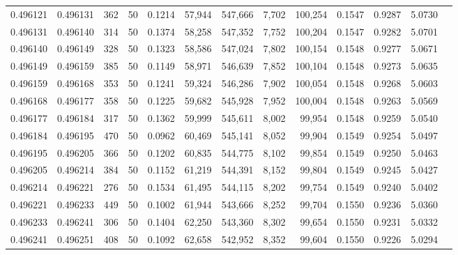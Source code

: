 \begin{tabular}{rrrrrrrrrrrrr}
0.496121 & 0.496131 & 362 &  50 &                                     0.1214 &  57,944 & 547,666 &   7,702 & 100,254 & 0.1547 & 0.9287 & 5.0730 \\
0.496131 & 0.496140 & 314 &  50 &                                     0.1374 &  58,258 & 547,352 &   7,752 & 100,204 & 0.1547 & 0.9282 & 5.0701 \\
0.496140 & 0.496149 & 328 &  50 &                                     0.1323 &  58,586 & 547,024 &   7,802 & 100,154 & 0.1548 & 0.9277 & 5.0671 \\
0.496149 & 0.496159 & 385 &  50 &                                     0.1149 &  58,971 & 546,639 &   7,852 & 100,104 & 0.1548 & 0.9273 & 5.0635 \\
0.496159 & 0.496168 & 353 &  50 &                                     0.1241 &  59,324 & 546,286 &   7,902 & 100,054 & 0.1548 & 0.9268 & 5.0603 \\
0.496168 & 0.496177 & 358 &  50 &                                     0.1225 &  59,682 & 545,928 &   7,952 & 100,004 & 0.1548 & 0.9263 & 5.0569 \\
0.496177 & 0.496184 & 317 &  50 &                                     0.1362 &  59,999 & 545,611 &   8,002 &  99,954 & 0.1548 & 0.9259 & 5.0540 \\
0.496184 & 0.496195 & 470 &  50 &                                     0.0962 &  60,469 & 545,141 &   8,052 &  99,904 & 0.1549 & 0.9254 & 5.0497 \\
0.496195 & 0.496205 & 366 &  50 &                                     0.1202 &  60,835 & 544,775 &   8,102 &  99,854 & 0.1549 & 0.9250 & 5.0463 \\
0.496205 & 0.496214 & 384 &  50 &                                     0.1152 &  61,219 & 544,391 &   8,152 &  99,804 & 0.1549 & 0.9245 & 5.0427 \\
0.496214 & 0.496221 & 276 &  50 &                                     0.1534 &  61,495 & 544,115 &   8,202 &  99,754 & 0.1549 & 0.9240 & 5.0402 \\
0.496221 & 0.496233 & 449 &  50 &                                     0.1002 &  61,944 & 543,666 &   8,252 &  99,704 & 0.1550 & 0.9236 & 5.0360 \\
0.496233 & 0.496241 & 306 &  50 &                                     0.1404 &  62,250 & 543,360 &   8,302 &  99,654 & 0.1550 & 0.9231 & 5.0332 \\
0.496241 & 0.496251 & 408 &  50 &                                     0.1092 &  62,658 & 542,952 &   8,352 &  99,604 & 0.1550 & 0.9226 & 5.0294 \\

\end{tabular}
